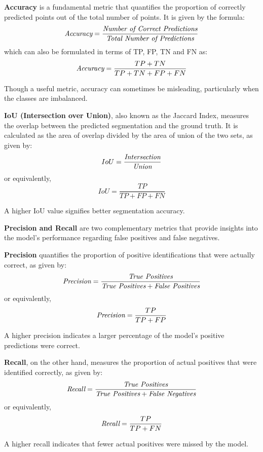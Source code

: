 \documentclass[11pt, a4paper,oneside,chapterprefix=false]{scrbook}
\begin{document}
\textbf{Accuracy} is a fundamental metric that quantifies the proportion of correctly predicted points out of the total number of points. It is given by the formula:
\[
    \emph{Accuracy} = \frac{\emph{Number of Correct Predictions}}{\emph{Total Number of Predictions}}
\]
which can also be formulated in terms of TP, FP, TN and FN as:
\[
    \emph{Accuracy} = \frac{TP + TN}{TP + TN + FP + FN}
\]

Though a useful metric, accuracy can sometimes be misleading, particularly when the classes are imbalanced.

\vspace{10pt}

\textbf{IoU (Intersection over Union)}, also known as the Jaccard Index, measures the overlap between the predicted segmentation and the ground truth. It is calculated as the area of overlap divided by the area of union of the two sets, as given by:
\[
    IoU = \frac{\emph{Intersection}}{\emph{Union}}
\]
or equivalently,
\[
    IoU = \frac{TP}{TP + FP + FN}
\]

A higher IoU value signifies better segmentation accuracy.

\vspace{10pt}

\textbf{Precision and Recall} are two complementary metrics that provide insights into the model's performance regarding false positives and false negatives. 

\vspace{10pt}

\textbf{Precision} quantifies the proportion of positive identifications that were actually correct, as given by:
\[
    \emph{Precision} = \frac{\emph{True Positives}}{\emph{True Positives} + \emph{False Positives}}
\]
or equivalently,
\[
    \emph{Precision} = \frac{TP}{TP + FP}
\]

A higher precision indicates a larger percentage of the model's positive predictions were correct.

\vspace{10pt}

\textbf{Recall}, on the other hand, measures the proportion of actual positives that were identified correctly, as given by:
\[
    \emph{Recall} = \frac{\emph{True Positives}}{\emph{True Positives} + \emph{False Negatives}}
\]
or equivalently,
\[
    \emph{Recall} = \frac{TP}{TP + FN}
\]

A higher recall indicates that fewer actual positives were missed by the model.

\vspace{10pt}
\end{document}
